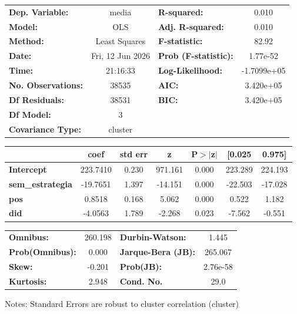 \begin{center}
\begin{tabular}{lclc}
\toprule
\textbf{Dep. Variable:}    &      media       & \textbf{  R-squared:         } &      0.010   \\
\textbf{Model:}            &       OLS        & \textbf{  Adj. R-squared:    } &      0.010   \\
\textbf{Method:}           &  Least Squares   & \textbf{  F-statistic:       } &      82.92   \\
\textbf{Date:}             & Fri, 12 Jun 2026 & \textbf{  Prob (F-statistic):} &   1.77e-52   \\
\textbf{Time:}             &     21:16:33     & \textbf{  Log-Likelihood:    } & -1.7099e+05  \\
\textbf{No. Observations:} &       38535      & \textbf{  AIC:               } &  3.420e+05   \\
\textbf{Df Residuals:}     &       38531      & \textbf{  BIC:               } &  3.420e+05   \\
\textbf{Df Model:}         &           3      & \textbf{                     } &              \\
\textbf{Covariance Type:}  &     cluster      & \textbf{                     } &              \\
\bottomrule
\end{tabular}
\begin{tabular}{lcccccc}
                         & \textbf{coef} & \textbf{std err} & \textbf{z} & \textbf{P$> |$z$|$} & \textbf{[0.025} & \textbf{0.975]}  \\
\midrule
\textbf{Intercept}       &     223.7410  &        0.230     &   971.161  &         0.000        &      223.289    &      224.193     \\
\textbf{sem\_estrategia} &     -19.7651  &        1.397     &   -14.151  &         0.000        &      -22.503    &      -17.028     \\
\textbf{pos}             &       0.8518  &        0.168     &     5.062  &         0.000        &        0.522    &        1.182     \\
\textbf{did}             &      -4.0563  &        1.789     &    -2.268  &         0.023        &       -7.562    &       -0.551     \\
\bottomrule
\end{tabular}
\begin{tabular}{lclc}
\textbf{Omnibus:}       & 260.198 & \textbf{  Durbin-Watson:     } &    1.445  \\
\textbf{Prob(Omnibus):} &   0.000 & \textbf{  Jarque-Bera (JB):  } &  265.067  \\
\textbf{Skew:}          &  -0.201 & \textbf{  Prob(JB):          } & 2.76e-58  \\
\textbf{Kurtosis:}      &   2.948 & \textbf{  Cond. No.          } &     29.0  \\
\bottomrule
\end{tabular}
\end{center}

Notes: \newline
 [1] Standard Errors are robust to cluster correlation (cluster)